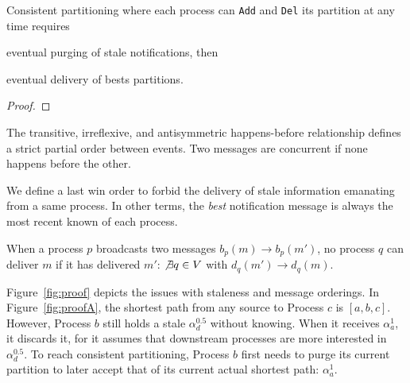 

\begin{corollary}
  Consistent partitioning where each process can \texttt{Add} and
  \texttt{Del} its partition at any time requires
  \begin{inparaenum}[(i)]
  \item eventual purging of stale notifications, then
  \item eventual delivery of bests partitions.
  \end{inparaenum}
\end{corollary}

\begin{proof}
\end{proof}



\begin{definition}
  The transitive, irreflexive, and antisymmetric happens-before
  relationship defines a strict partial order between events. Two
  messages are concurrent if none happens before the other.
\end{definition}

We define a last win order to forbid the delivery of stale information
emanating from a same process. In other terms, the \emph{best}
notification message is always the most recent known of each process.
 
\begin{definition}
  When a process $p$ broadcasts two messages $b_p(m) \rightarrow
  b_p(m')$, no process $q$ can deliver $m$ if it has delivered $m'$:
  $\not\exists q \in V$ with $d_q(m') \rightarrow d_q(m)$.
\end{definition}



Figure~\ref{fig:proof} depicts the issues with staleness and message
orderings. In Figure~\ref{fig:proofA}, the shortest path from any
source to Process $c$ is $[a, b, c]$. However, Process $b$ still holds
a stale $\alpha_d^{0.5}$ without knowing. When it receives
$\alpha_a^1$, it discards it, for it assumes that downstream processes
are more interested in $\alpha_d^{0.5}$. To reach consistent
partitioning, Process $b$ first needs to purge its current partition
to later accept that of its current actual shortest path:
$\alpha_a^1$.

